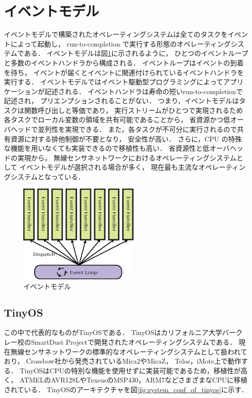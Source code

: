 \section{イベントモデル}\label{sec:event_model}
イベントモデルで構築されたオペレーティングシステムは全てのタスクをイベントによって起動し，
run-to-completion で実行する形態のオペレーティングシステムである．
イベントモデルは図\ref{fig:event_model}に示されるように，
ひとつのイベントループと多数のイベントハンドラから構成される．
イベントループはイベントの到着を待ち，
イベントが届くとイベントに関連付けられているイベントハンドラを実行する．
イベントモデルではイベント駆動型プログラミングによってアプリケーションが記述される．
イベントハンドラは寿命の短いrun-to-completionで記述され，
プリエンプションされることがない．
つまり，イベントモデルはタスクは関数呼び出しと等価であり，
実行ストリームがひとつで実現されるため各タスクでローカル変数の領域を共有可能であることから，
省資源かつ低オーバヘッドで並列性を実現できる．
また，各タスクが不可分に実行されるので共有資源に対する排他制御が不要となり，
安全性が高い．
さらに，CPU の特殊な機能を用いなくても実装できるので移植性も高い．
省資源性と低オーバヘッドの実現から，
無線センサネットワークにおけるオペレーティングシステムとして
イベントモデルが選択される場合が多く，
現在最も主流なオペレーティングシステムとなっている．
\begin{figure}[htbp]
 \begin{center}
  \includegraphics[width=60mm]{./images/event_model.eps}
 \end{center}
 \caption{イベントモデル}
 \label{fig:event_model}
\end{figure}


\subsection{TinyOS}
この中で代表的なものがTinyOS\cite{Hill:2000:SAD:356989.356998}\cite{Levis04tinyos:an}である．
TinyOSはカリフォルニア大学バークレー校のSmartDust Projectで開発されたオペレーティングシステムである．
現在無線センサネットワークの標準的なオペレーティングシステムとして扱われており，
Crossbow社から発売されているMica2やMicaZ\cite{Hill:2002:MWP:623308.624560}，
Telos\cite{Polastre:2005:TEU:1147685.1147744}，iMote\cite{Nachman:2005:IMP:1147685.1147760}上で動作する．
TinyOSはCPUの特別な機能を使用せずに実装可能であるため，移植性が高く，
ATMELのAVR128LやTexsusのMSP430，ARM7などさまざまなCPUに移植されている．
TinyOSのアーキテクチャを図\ref{fig:system_conf_of_tinyos}に示す．

